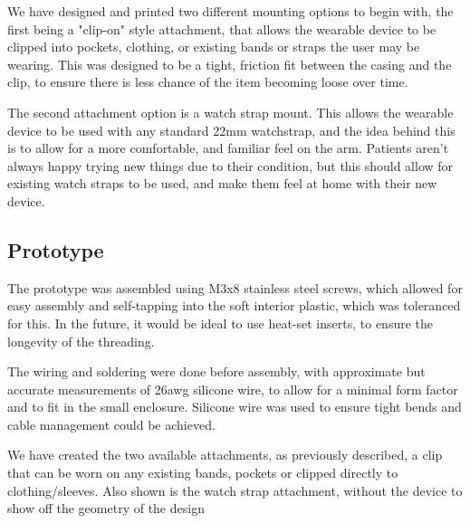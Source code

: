                     
        
                    We have designed and printed two different mounting options to begin with, the first being a "clip-on" style attachment, that allows the wearable device to be clipped into pockets, clothing, or existing bands or straps the user may be wearing. This was designed to be a tight, friction fit between the casing and the clip, to ensure there is less chance of the item becoming loose over time.
        
                    
        
                    The second attachment option is a watch strap mount. This allows the wearable device to be used with any standard 22mm watchstrap, and the idea behind this is to allow for a more comfortable, and familiar feel on the arm. Patients aren't always happy trying new things due to their condition, but this should allow for existing watch straps to be used, and make them feel at home with their new device.
        
                    
        
                \subsection{Prototype}
                \label{subsec:Prototype_wearable}
        
                    The prototype was assembled using M3x8 stainless steel screws, which allowed for easy assembly and self-tapping into the soft interior plastic, which was toleranced for this. In the future, it would be ideal to use heat-set inserts, to ensure the longevity of the threading.
        
                    
        
                    The wiring and soldering were done before assembly, with approximate but accurate measurements of 26awg silicone wire, to allow for a minimal form factor and to fit in the small enclosure. Silicone wire was used to ensure tight bends and cable management could be achieved.
        
                    
        
                    We have created the two available attachments, as previously described, a clip that can be worn on any existing bands, pockets or clipped directly to clothing/sleeves. Also shown is the watch strap attachment, without the device to show off the geometry of the design
        
